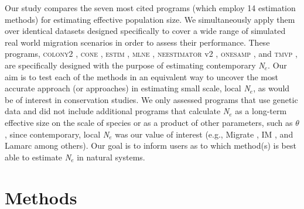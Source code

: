 Our study compares the seven most cited programs (which employ 14 estimation methods) for 
estimating effective population size. We simultaneously apply them over identical datasets 
designed specifically to cover a wide range of simulated real world migration scenarios in 
order to assess their performance. These programs, \textsc{colony2} \citep{Wang:2009}, \textsc{cone} \citep{Anderson:2005}, 
\textsc{estim} \citep{Vitalis:2001c}, \textsc{mlne} \citep{Wang:2003}, 
\textsc{neestimator} v2 \citep{Do:2014}, \textsc{onesamp} \citep{Tallmon:2008}, and 
\textsc{tmvp} \citep{Beaumont:2003}, are specifically designed with the purpose of estimating 
contemporary \emph{N}$_e$. Our aim is to test each of the methods in an equivalent way 
to uncover the most accurate approach (or approaches) in estimating small scale, local 
\emph{N}$_e$, as would be of interest in conservation studies. We only assessed programs 
that use genetic data and did not include additional programs that calculate \emph{N}$_e$ 
as a long-term effective size on the scale of species or as a product of other parameters, 
such as $\theta$, since contemporary, local \emph{N}$_e$ was our value of interest 
(e.g., Migrate \citep{Beerli:2001}, IM \citep{Hey:2004}, and Lamarc \citep{Kuhner:2006} among others). 
Our goal is to inform users as to which method(s) is best able to estimate \emph{N}$_e$ in natural systems.

\section{Methods}
